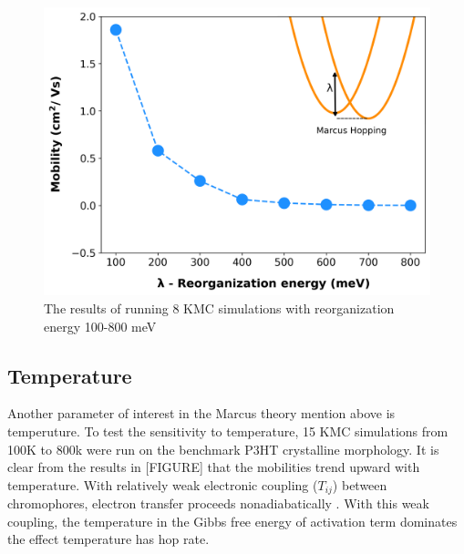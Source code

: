 \begin{figure}
  \center
  \includegraphics[width=0.8\linewidth]{figures/reorg.png} 
    \caption{The results of running 8 KMC simulations with reorganization energy 100-800 meV}
  \label{fig:reorg}
\end{figure}

\subsection{Temperature}

Another parameter of interest in the Marcus theory mention above is temperuture. To test the sensitivity to
temperature, 15 KMC simulations from 100K to 800k were run on the benchmark P3HT crystalline morphology. It
is clear from the results in [FIGURE] that the mobilities trend upward with temperature. With relatively
weak electronic coupling ($T_{ij}$) between chromophores, electron transfer proceeds nonadiabatically
\cite{clarke2010}. With this weak coupling, the temperature in the Gibbs free energy of activation term
dominates the effect temperature has hop rate. 

